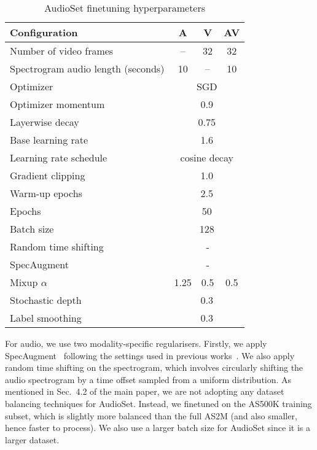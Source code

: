 \documentclass[10pt,twocolumn,letterpaper]{article}
\begin{document}
\begin{table}[th] 
	\caption{ AudioSet finetuning hyperparameters
	}
	\vspace{-0.6\baselineskip}
	\centering
		\begin{tabular}{lccc}
			\toprule
			Configuration        & A &  V & AV \\
			\midrule
			Number of video frames     & -- & 32 & 32\\
			Spectrogram audio length (seconds)    & 10 & -- & 10  \\
			\midrule
			Optimizer              & \multicolumn{3}{c}{SGD}         \\
			Optimizer momentum        & \multicolumn{3}{c}{0.9}         \\
			Layerwise decay~\cite{bao2021beit, clark2020electra}    & \multicolumn{3}{c}{0.75}      \\
			Base learning rate          & \multicolumn{3}{c}{1.6}  \\
			Learning rate schedule     & \multicolumn{3}{c}{cosine decay} \\
			Gradient clipping        & \multicolumn{3}{c}{1.0} \\  
			Warm-up epochs          & \multicolumn{3}{c}{2.5} \\
			Epochs                 & \multicolumn{3}{c}{50} \\
			Batch size             & \multicolumn{3}{c}{128} \\
			\midrule
			Random time shifting     & \checkmark     & -    &  \checkmark  \\
			SpecAugment \cite{park2019specaugment}   & \checkmark     & -  & \checkmark \\
			Mixup $\alpha$ \cite{zhang_mixup_iclr_2018}           & 1.25  & 0.5 & 0.5 \\ Stochastic depth  \cite{huang_stochasticdepth_eccv_2016}    & \multicolumn{3}{c}{0.3} \\
			Label smoothing  \cite{szegedy_cvpr_2016}      & \multicolumn{3}{c}{0.3} \\
			\bottomrule
		\end{tabular}
		\label{tab:hyperparams_audioset}
\end{table}
 

For audio, we use two modality-specific regularisers.
Firstly, we apply SpecAugment~\cite{park2019specaugment} following the settings used in previous works~\cite{nagrani2021attention, gong2021ast}.
We also apply random time shifting on the spectrogram, which involves circularly shifting the audio spectrogram by a time offset sampled from a uniform distribution.
As mentioned in Sec.~4.2 of the main paper, we are not adopting any dataset balancing techniques for AudioSet.
Instead, we finetuned on the AS500K training subset, which is slightly more balanced than the full AS2M (and also smaller, hence faster to process).
We also use a larger batch size for AudioSet since it is a larger dataset.
\end{document}
